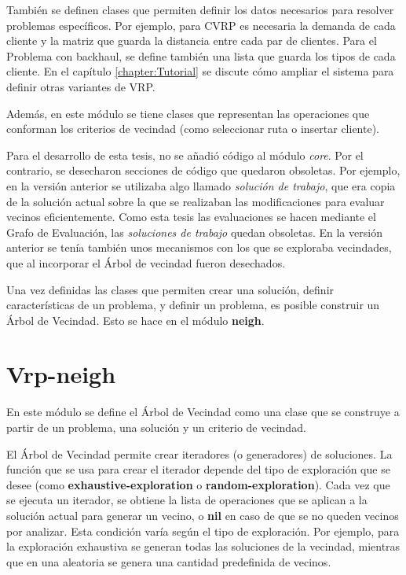 También se definen clases que permiten definir los datos necesarios para resolver problemas específicos. Por ejemplo, para CVRP es necesaria la demanda de cada cliente y la matriz que guarda la distancia entre cada par de clientes. Para el Problema con backhaul, se define también una lista que guarda los tipos de cada cliente. En el capítulo \ref{chapter:Tutorial} se discute cómo ampliar el sistema para definir otras variantes de VRP.

Además, en este módulo se tiene clases que representan las operaciones que conforman los criterios de vecindad (como seleccionar ruta o insertar cliente).

Para el desarrollo de esta tesis, no se añadió código al módulo \textit{core}. Por el contrario, se desecharon secciones de código que quedaron obsoletas. Por ejemplo, en la versión anterior se utilizaba algo llamado \textit{solución de trabajo}, que era copia de la solución actual sobre la que se realizaban las modificaciones para evaluar vecinos eficientemente. Como esta tesis las evaluaciones se hacen mediante el Grafo de Evaluación, las \textit{soluciones de trabajo} quedan obsoletas. En la versión anterior se tenía también unos mecanismos con los que se exploraba vecindades, que al incorporar el Árbol de vecindad fueron desechados.

Una vez definidas las clases que permiten crear una solución, definir características de un problema, y definir un problema, es posible construir un Árbol de Vecindad. Esto se hace en el módulo \textbf{neigh}.

\section{Vrp-neigh}\label{2-neigh}
En este módulo se define el Árbol de Vecindad como una clase que se construye a partir de un problema, una solución y un criterio de vecindad. 

El Árbol de Vecindad permite crear iteradores (o generadores) de soluciones. La función que se usa para crear el iterador depende del tipo de exploración que se desee (como \textbf{exhaustive-exploration} o \textbf{random-exploration}). Cada vez que se ejecuta un iterador, se obtiene la lista de operaciones que se aplican a la solución actual para generar un vecino, o \textbf{nil} en caso de que se no queden vecinos por analizar. Esta condición varía según el tipo de exploración. Por ejemplo, para la exploración exhaustiva se generan todas las soluciones de la vecindad, mientras que en una aleatoria se genera una cantidad predefinida de vecinos. 

